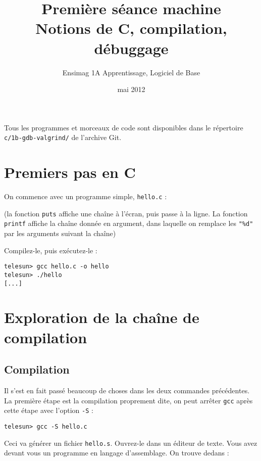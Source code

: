 \documentclass[11pt]{article}
\title{Première séance machine\\Notions de C, compilation, débuggage}
\author{Ensimag 1A Apprentissage, Logiciel de Base}
\date{mai 2012}
\begin{document}
\maketitle

Tous les programmes et morceaux de code sont disponibles dans le
répertoire \texttt{c/1b-gdb-valgrind/} de l'archive Git.

\section{Premiers pas en C}

On commence avec un programme simple, \texttt{hello.c} :



(la fonction \texttt{puts} affiche une chaîne à l'écran, puis passe à
la ligne. La fonction \texttt{printf} affiche la chaîne donnée en
argument, dans laquelle on remplace les \texttt{"\%d"} par les
arguments suivant la chaîne)


Compilez-le, puis exécutez-le :

\begin{verbatim}
telesun> gcc hello.c -o hello
telesun> ./hello
[...]
\end{verbatim}

\section{Exploration de la chaîne de compilation}

\subsection{Compilation}

Il s'est en fait passé beaucoup de choses dans les deux commandes
précédentes. La première étape est la compilation proprement dite, on
peut arrêter \texttt{gcc} après cette étape avec l'option
\texttt{-S} :

\begin{verbatim}
telesun> gcc -S hello.c
\end{verbatim}

Ceci va générer un fichier \texttt{hello.s}. Ouvrez-le dans un éditeur
de texte. Vous avez devant vous un programme en langage d'assemblage.
On trouve dedans :
\end{document}
